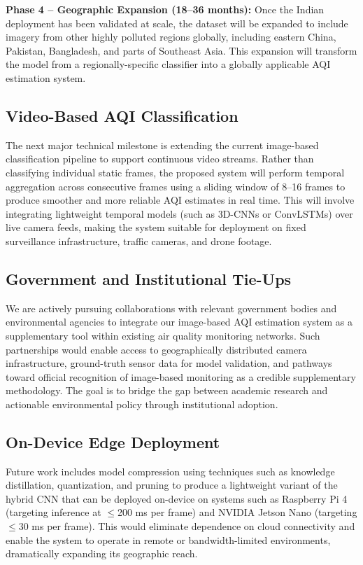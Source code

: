 \documentclass[conference]{IEEEtran}
\begin{document}
\textbf{Phase 4 -- Geographic Expansion (18--36 months):} Once the Indian
deployment has been validated at scale, the dataset will be expanded to
include imagery from other highly polluted regions globally, including
eastern China, Pakistan, Bangladesh, and parts of Southeast Asia. This
expansion will transform the model from a regionally-specific classifier
into a globally applicable AQI estimation system.

\subsection{Video-Based AQI Classification}

The next major technical milestone is extending the current image-based
classification pipeline to support continuous video streams. Rather than
classifying individual static frames, the proposed system will perform
temporal aggregation across consecutive frames using a sliding window of
8--16 frames to produce smoother and more reliable AQI estimates in real
time. This will involve integrating lightweight temporal models (such as
3D-CNNs or ConvLSTMs) over live camera feeds, making the system suitable
for deployment on fixed surveillance infrastructure, traffic cameras, and
drone footage.

\subsection{Government and Institutional Tie-Ups}

We are actively pursuing collaborations with relevant government bodies and
environmental agencies to integrate our image-based AQI estimation system as
a supplementary tool within existing air quality monitoring networks. Such
partnerships would enable access to geographically distributed camera
infrastructure, ground-truth sensor data for model validation, and pathways
toward official recognition of image-based monitoring as a credible
supplementary methodology. The goal is to bridge the gap between academic
research and actionable environmental policy through institutional adoption.

\subsection{On-Device Edge Deployment}

Future work includes model compression using techniques such as knowledge
distillation, quantization, and pruning to produce a lightweight variant of
the hybrid CNN that can be deployed on-device on systems such as Raspberry Pi
4 (targeting inference at $\leq$200 ms per frame) and NVIDIA Jetson Nano
(targeting $\leq$30 ms per frame). This would eliminate dependence on cloud
connectivity and enable the system to operate in remote or bandwidth-limited
environments, dramatically expanding its geographic reach.
\end{document}
